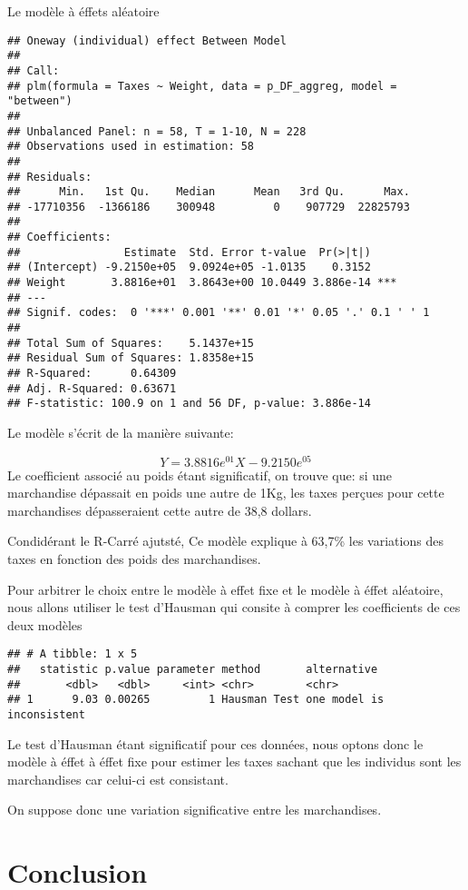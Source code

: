 \documentclass[
]{book}
\begin{document}
Le modèle à éffets aléatoire

\begin{verbatim}
## Oneway (individual) effect Between Model
## 
## Call:
## plm(formula = Taxes ~ Weight, data = p_DF_aggreg, model = "between")
## 
## Unbalanced Panel: n = 58, T = 1-10, N = 228
## Observations used in estimation: 58
## 
## Residuals:
##      Min.   1st Qu.    Median      Mean   3rd Qu.      Max. 
## -17710356  -1366186    300948         0    907729  22825793 
## 
## Coefficients:
##                Estimate  Std. Error t-value  Pr(>|t|)    
## (Intercept) -9.2150e+05  9.0924e+05 -1.0135    0.3152    
## Weight       3.8816e+01  3.8643e+00 10.0449 3.886e-14 ***
## ---
## Signif. codes:  0 '***' 0.001 '**' 0.01 '*' 0.05 '.' 0.1 ' ' 1
## 
## Total Sum of Squares:    5.1437e+15
## Residual Sum of Squares: 1.8358e+15
## R-Squared:      0.64309
## Adj. R-Squared: 0.63671
## F-statistic: 100.9 on 1 and 56 DF, p-value: 3.886e-14
\end{verbatim}

Le modèle s'écrit de la manière suivante:

\[Y= 3.8816e^{01}X -9.2150e^{05}\]
Le coefficient associé au poids étant significatif, on trouve que: si une marchandise dépassait en poids une autre de 1Kg, les taxes perçues pour cette marchandises dépasseraient cette autre de 38,8 dollars.

Condidérant le R-Carré ajutsté, Ce modèle explique à 63,7\% les variations des taxes en fonction des poids des marchandises.

Pour arbitrer le choix entre le modèle à effet fixe et le modèle à éffet aléatoire, nous allons utiliser le test d'Hausman qui consite à comprer les coefficients de ces deux modèles

\begin{verbatim}
## # A tibble: 1 x 5
##   statistic p.value parameter method       alternative              
##       <dbl>   <dbl>     <int> <chr>        <chr>                    
## 1      9.03 0.00265         1 Hausman Test one model is inconsistent
\end{verbatim}

Le test d'Hausman étant significatif pour ces données, nous optons donc le modèle à éffet à éffet fixe pour estimer les taxes sachant que les individus sont les marchandises car celui-ci est consistant.

On suppose donc une variation significative entre les marchandises.

\hypertarget{conclusion}{%
\chapter{Conclusion}\label{conclusion}}
\end{document}
